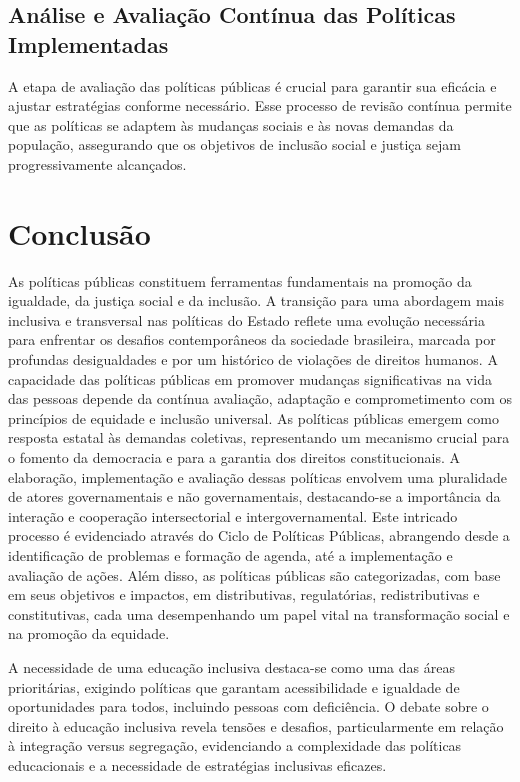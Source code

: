 \documentclass[
   article,       
   12pt,          
   oneside,       
   a4paper,       
   english,       
   brazil,        
   sumario=tradicional
   ]{abntex2}
\begin{document}
\subsection{Análise e Avaliação Contínua das Políticas Implementadas}
A etapa de avaliação das políticas públicas é crucial para garantir sua eficácia e ajustar estratégias conforme necessário. Esse processo de revisão contínua permite que as políticas se adaptem às mudanças sociais e às novas demandas da população, assegurando que os objetivos de inclusão social e justiça sejam progressivamente alcançados.

\section{Conclusão}
As políticas públicas constituem ferramentas fundamentais na promoção da igualdade, da justiça social e da inclusão. A transição para uma abordagem mais inclusiva e transversal nas políticas do Estado reflete uma evolução necessária para enfrentar os desafios contemporâneos da sociedade brasileira, marcada por profundas desigualdades e por um histórico de violações de direitos humanos. A capacidade das políticas públicas em promover mudanças significativas na vida das pessoas depende da contínua avaliação, adaptação e comprometimento com os princípios de equidade e inclusão universal.
As políticas públicas emergem como resposta estatal às demandas coletivas, representando um mecanismo crucial para o fomento da democracia e para a garantia dos direitos constitucionais. A elaboração, implementação e avaliação dessas políticas envolvem uma pluralidade de atores governamentais e não governamentais, destacando-se a importância da interação e cooperação intersectorial e intergovernamental. Este intricado processo é evidenciado através do Ciclo de Políticas Públicas, abrangendo desde a identificação de problemas e formação de agenda, até a implementação e avaliação de ações. Além disso, as políticas públicas são categorizadas, com base em seus objetivos e impactos, em distributivas, regulatórias, redistributivas e constitutivas, cada uma desempenhando um papel vital na transformação social e na promoção da equidade.

A necessidade de uma educação inclusiva destaca-se como uma das áreas prioritárias, exigindo políticas que garantam acessibilidade e igualdade de oportunidades para todos, incluindo pessoas com deficiência. O debate sobre o direito à educação inclusiva revela tensões e desafios, particularmente em relação à integração versus segregação, evidenciando a complexidade das políticas educacionais e a necessidade de estratégias inclusivas eficazes.
\end{document}
